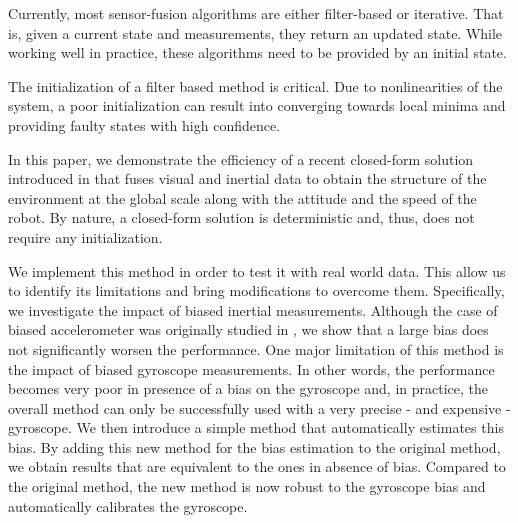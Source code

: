 \documentclass[letterpaper, 10 pt, conference]{ieeeconf}  %
\begin{document}
Currently, most sensor-fusion algorithms are either filter-based or iterative. That is, given a current state and measurements, they return an updated state.
While working well in practice, these algorithms need to be provided by an initial state.

The initialization of a filter based method is critical.
Due to nonlinearities of the system, a poor initialization can result into converging towards local minima and  providing faulty states with high confidence.

In this paper, we demonstrate the efficiency of a recent closed-form solution introduced in \cite{Martinelli2012}\cite{Martinelli2014} that fuses visual and inertial data to obtain the structure of the environment at the global scale along with the attitude and the speed of the robot.
By nature, a closed-form solution is deterministic and, thus, does not require any initialization.


We implement this method in order to test it with real world data.
This allow us to identify its limitations and bring modifications to overcome them.
Specifically, we investigate the impact of biased inertial measurements.
Although the case of biased accelerometer was originally studied in \cite{Martinelli2014}, we show that a large bias does not significantly worsen the performance.
One major limitation of this method is the impact of biased gyroscope measurements.
In other words, the performance becomes very poor in presence of a bias on the gyroscope and, in practice, the overall method can only be successfully used with a very precise - and expensive - gyroscope.
We then introduce a simple method that automatically estimates this bias. By adding this new method for the bias estimation to the original method, we obtain results that are equivalent to the ones in absence of bias.
Compared to the original method, the new method is now robust to the gyroscope bias and automatically calibrates the gyroscope.


\end{document}
